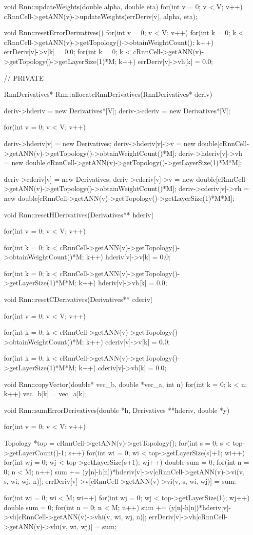 void Rnn::updateWeights(double alpha, double eta){
  for(int v = 0; v < V; v++)
    cRnnCell->getANN(v)->updateWeights(errDeriv[v], alpha, eta);
}

void Rnn::resetErrorDerivatives(){
  for(int v = 0; v < V; v++){
    for(int k = 0; k < cRnnCell->getANN(v)->getTopology()->obtainWeightCount(); k++)
      errDeriv[v]->v[k] = 0.0;
    for(int k = 0; k < cRnnCell->getANN(v)->getTopology()->getLayerSize(1)*M; k++)
      errDeriv[v]->vh[k] = 0.0;
  }
}


// PRIVATE


RnnDerivatives* Rnn::allocateRnnDerivatives(RnnDerivatives* deriv){
  deriv->hderiv = new Derivatives*[V];
  deriv->cderiv = new Derivatives*[V];

  for(int v = 0; v < V; v++){
    deriv->hderiv[v] = new Derivatives;
    deriv->hderiv[v]->v = new double[cRnnCell->getANN(v)->getTopology()->obtainWeightCount()*M];
    deriv->hderiv[v]->vh = new double[cRnnCell->getANN(v)->getTopology()->getLayerSize(1)*M*M];

    deriv->cderiv[v] = new Derivatives;
    deriv->cderiv[v]->v = new double[cRnnCell->getANN(v)->getTopology()->obtainWeightCount()*M];
    deriv->cderiv[v]->vh = new double[cRnnCell->getANN(v)->getTopology()->getLayerSize(1)*M*M];
  }
}


void Rnn::resetHDerivatives(Derivatives** hderiv){
  for(int v = 0; v < V; v++){
    for(int k = 0; k < cRnnCell->getANN(v)->getTopology()->obtainWeightCount()*M; k++)
      hderiv[v]->v[k] = 0.0;

    for(int k = 0; k < cRnnCell->getANN(v)->getTopology()->getLayerSize(1)*M*M; k++)
      hderiv[v]->vh[k] = 0.0;

  }
}
void Rnn::resetCDerivatives(Derivatives** cderiv){
  for(int v = 0; v < V; v++){
    for(int k = 0; k < cRnnCell->getANN(v)->getTopology()->obtainWeightCount()*M; k++)
      cderiv[v]->v[k] = 0.0;

    for(int k = 0; k < cRnnCell->getANN(v)->getTopology()->getLayerSize(1)*M*M; k++)
      cderiv[v]->vh[k] = 0.0;

  }
}


void Rnn::copyVector(double* vec_b, double *vec_a, int n){
  for(int k = 0; k < n; k++)
    vec_b[k] = vec_a[k];
}

void Rnn::sumErrorDerivatives(double *h, Derivatives **hderiv, double *y){
  for(int v = 0; v < V; v++){
    Topology *top = cRnnCell->getANN(v)->getTopology();
    for(int s = 0; s < top->getLayerCount()-1; s++){
      for(int wi = 0; wi < top->getLayerSize(s)+1; wi++){
        for(int wj = 0; wj < top->getLayerSize(s+1); wj++){
          double sum = 0;
          for(int n = 0; n < M; n++)
            sum += (y[n]-h[n])*hderiv[v]->v[cRnnCell->getANN(v)->vi(v, s, wi, wj, n)];
          errDeriv[v]->v[cRnnCell->getANN(v)->vi(v, s, wi, wj)] = sum;
        }
      }
    }


    for(int wi = 0; wi < M; wi++){
      for(int wj = 0; wj < top->getLayerSize(1); wj++){
        double sum = 0;
        for(int n = 0; n < M; n++)
          sum += (y[n]-h[n])*hderiv[v]->vh[cRnnCell->getANN(v)->vhi(v, wi, wj, n)];
        errDeriv[v]->vh[cRnnCell->getANN(v)->vhi(v, wi, wj)] = sum;
      }
    }
  }
}

